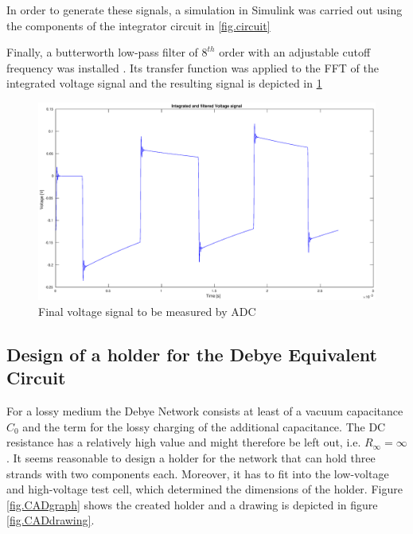 In order to generate these signals, a simulation in Simulink was carried out using the components of the integrator circuit in \ref{fig.circuit}


Finally, a butterworth low-pass filter of $8^{th}$ order with an adjustable cutoff frequency
was installed \footnotemark. Its transfer function was applied to the FFT of the integrated voltage signal and the resulting 
signal is depicted in \ref{fig.finalvolt}

\begin{figure}[h!tb]
\centerline{\includegraphics[width=\textwidth]{figures/Method/signal_simulation/finalvolt.eps}}
\caption{Final voltage signal to be measured by ADC}
\label{fig.finalvolt}
\end{figure}


\subsection{Design of a holder for the Debye Equivalent Circuit}
For a lossy medium the Debye Network consists at least of a vacuum capacitance $C_0$ and the term for the lossy charging of the additional capacitance. The DC resistance has a relatively high value and might therefore be left out, i.e. $R_{\infty}={\infty}$. It seems reasonable to design a holder for the network that can hold three strands with two components each. Moreover, it has to fit into the low-voltage and high-voltage test cell, which determined the dimensions of the holder.  
Figure \ref{fig.CADgraph} shows the created holder and a drawing is depicted in figure \ref{fig.CADdrawing}.

